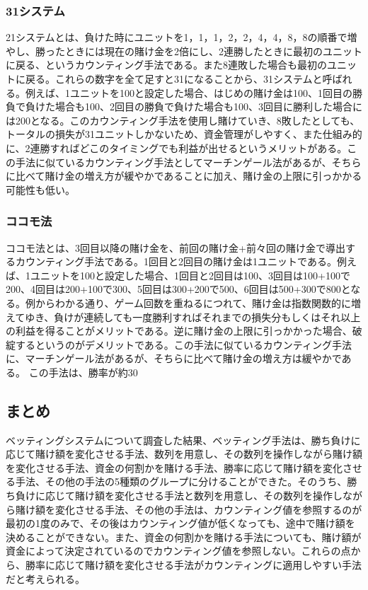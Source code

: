\subsubsection{31システム}
21システムとは、負けた時にユニットを1，1，1，2，2，4，4，8，8の順番で増やし、勝ったときには現在の賭け金を2倍にし、2連勝したときに最初のユニットに戻る、というカウンティング手法である。また8連敗した場合も最初のユニットに戻る。これらの数字を全て足すと31になることから、31システムと呼ばれる。例えば、1ユニットを100と設定した場合、はじめの賭け金は100、1回目の勝負で負けた場合も100、2回目の勝負で負けた場合も100、3回目に勝利した場合には200となる。このカウンティング手法を使用し賭けていき、8敗したとしても、トータルの損失が31ユニットしかないため、資金管理がしやすく、また仕組み的に、2連勝すればどこのタイミングでも利益が出せるというメリットがある。この手法に似ているカウンティング手法としてマーチンゲール法があるが、そちらに比べて賭け金の増え方が緩やかであることに加え、賭け金の上限に引っかかる可能性も低い。
\subsubsection{ココモ法}
ココモ法とは、3回目以降の賭け金を、前回の賭け金+前々回の賭け金で導出するカウンティング手法である。1回目と2回目の賭け金は1ユニットである。例えば、1ユニットを100と設定した場合、1回目と2回目は100、3回目は100+100で200、4回目は200+100で300、5回目は300+200で500、6回目は500+300で800となる。例からわかる通り、ゲーム回数を重ねるにつれて、賭け金は指数関数的に増えてゆき、負けが連続しても一度勝利すればそれまでの損失分もしくはそれ以上の利益を得ることがメリットである。逆に賭け金の上限に引っかかった場合、破綻するというのがデメリットである。この手法に似ているカウンティング手法に、マーチンゲール法があるが、そちらに比べて賭け金の増え方は緩やかである。
この手法は、勝率が約30%

\subsection{まとめ}
ベッティングシステムについて調査した結果、ベッティング手法は、勝ち負けに応じて賭け額を変化させる手法、数列を用意し、その数列を操作しながら賭け額を変化させる手法、資金の何割かを賭ける手法、勝率に応じて賭け額を変化させる手法、その他の手法の5種類のグループに分けることができた。そのうち、勝ち負けに応じて賭け額を変化させる手法と数列を用意し、その数列を操作しながら賭け額を変化させる手法、その他の手法は、カウンティング値を参照するのが最初の1度のみで、その後はカウンティング値が低くなっても、途中で賭け額を決めることができない。また、資金の何割かを賭ける手法についても、賭け額が資金によって決定されているのでカウンティング値を参照しない。これらの点から、勝率に応じて賭け額を変化させる手法がカウンティングに適用しやすい手法だと考えられる。
